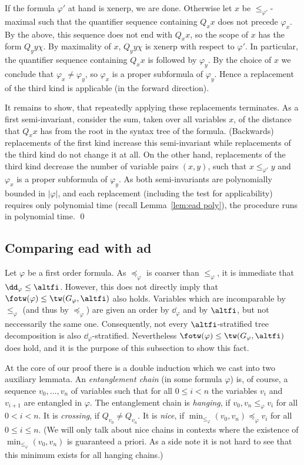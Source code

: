 \documentclass{LMCS}
\newcommand{\gfi}{G_{\varphi}}
\renewcommand{\phi}{\varphi}
\newcommand{\ad}{\dd_{\varphi}}
\begin{document}
If the formula $\phi'$ at hand is xenerp, we are done. 
Otherwise let $x$ be $\leq_{\phi'}$-maximal 
such that the quantifier sequence containing $Q_xx$ does not precede $\phi_x$. 
By the above, this sequence does not end with $Q_xx$, 
so the scope of $x$ has the form $Q_yy\chi$. 
By maximality of $x$, $Q_yy\chi$ is xenerp with respect to $\phi'$. 
In particular, 
the quantifier sequence containing $Q_xx$ is followed by $\phi_y$. 
By the choice of $x$ we conclude that $\phi_x\not=\phi_y$, 
so $\phi_x$ is a proper subformula of $\phi_y$. 
Hence a replacement of the third kind is applicable 
(in the forward direction). 

It remains to show, that repeatedly applying these replacements terminates. 
As a first semi-invariant, consider the sum, taken over all variables $x$, 
of the distance that $Q_xx$ has from the root 
in the syntax tree of the formula. 
(Backwards) replacements of the first kind increase this semi-invariant 
while replacements of the third kind do not change it at all. 
On the other hand, replacements of the third kind 
decrease the number of variable pairs $(x,y)$, 
such that $x\leq_{\phi'}y$ and $\phi_x$ is a proper subformula of $\phi_y$. 
As both semi-invariants are polynomially bounded in $|\phi|$, 
and each replacement (including the test for applicability) 
requires only polynomial time (recall Lemma~\ref{lem:ead poly}), 
the procedure runs in polynomial time. 
\qed




\subsection{Comparing ead with ad}\label{section:comparing}

Let $\phi$ be a first order formula. 
As $\preceq_{\phi}$ is coarser than $\leq_{\phi}$, 
it is immediate that $\ad\leq\altfi$. 
However, this does not directly imply 
that $\fotw(\phi)\leq\tw(\gfi,\altfi)$ also holds. 
Variables which are incomparable by $\leq_{\phi}$ 
(and thus by $\preceq_{\phi}$) 
are given an order by $\ad$ and by $\altfi$, 
but not neccessarily the same one. 
Consequently, not every $\altfi$-stratified tree decomposition 
is also $\ad$-stratified. 
Nevertheless $\fotw(\phi)\leq\tw(\gfi,\altfi)$ does hold, 
and it is the purpose of this subsection to show this fact. 

At the core of our proof there is a double induction 
which we cast into two auxiliary lemmata. 
An \emph{entanglement chain} (in some formula $\phi$) 
is, of course, a sequence $v_0,\ldots,v_n$ of variables 
such that for all $0\leq i<n$ the variables $v_i$ and $v_{i+1}$ 
are entangled in $\phi$. 
The entanglement chain is \emph{hanging}, 
if $v_0,v_n\leq_{\phi}v_i$ for all $0<i<n$. 
It is \emph{crossing}, if $Q_{v_0}\not=Q_{v_n}$. 
It is \emph{nice}, 
if $\min_{\leq_{\phi}}(v_0,v_n)\preceq_{\phi}v_i$ for all $0\leq i\leq n$.
(We will only talk about nice chains in contexts 
where the existence of $\min_{\leq_{\phi}}(v_0,v_n)$ is guaranteed a priori.
As a side note it is not hard to see 
that this minimum exists for all hanging chains.) 
\end{document}
